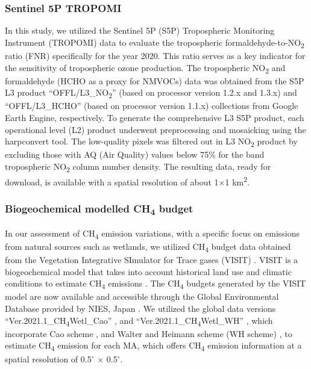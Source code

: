 \subsubsection{Sentinel 5P TROPOMI}
In this study, we utilized the Sentinel 5P (S5P) Tropospheric Monitoring Instrument (TROPOMI) data to evaluate the tropospheric formaldehyde-to-NO\textsubscript{2} ratio (FNR) specifically for the year 2020. This ratio serves as a key indicator for the sensitivity of tropospheric ozone production. The tropospheric NO\textsubscript{2} and formaldehyde (HCHO \textminus as a proxy for NMVOCs) data was obtained from the S5P L3 product \enquote{OFFL\slash L3\_NO\textsubscript{2}} (based on processor version 1.2.x and 1.3.x) and \enquote{OFFL\slash L3\_HCHO} (based on processor version 1.1.x) collections from Google Earth Engine, respectively. To generate the comprehensive L3 S5P product, each operational level (L2) product underwent preprocessing and mosaicking using the harpconvert tool. The low-quality pixels was filtered out in L3 NO\textsubscript{2} product by excluding those with AQ (Air Quality) values below 75\% for the band tropospheric NO\textsubscript{2} column number density. The resulting data, ready for download, is available with a spatial resolution of about 1$\times$1 km\textsuperscript{2}.
\subsubsection{Biogeochemical modelled CH\textsubscript{4} budget}
In our assessment of CH\textsubscript{4} emission variations, with a specific focus on emissions from natural sources such as wetlands, we utilized CH\textsubscript{4} budget data obtained from the Vegetation Integrative SImulator for Trace gases (VISIT) \citep{ito2019methane}. VISIT is a biogeochemical model that takes into account historical land use and climatic conditions to estimate CH\textsubscript{4} emissions \citep{ito2019methane}. The CH\textsubscript{4} budgets generated by the VISIT model are now available and accessible through the Global Environmental Database provided by NIES, Japan \citep{ito2019methane}. We utilized the global data versions \enquote{Ver.2021.1\_CH\textsubscript{4}Wetl\_Cao} \citep{ito2021cao}, and \enquote{Ver.2021.1\_CH\textsubscript{4}Wetl\_WH} \citep{ito2021wh}, which incorporate Cao scheme \citep{cao1996global}, and Walter and Heimann scheme (WH scheme) \citep{walter2000process}, to estimate CH\textsubscript{4} emission for each MA, which offers CH\textsubscript{4} emission information at a spatial resolution of 0.5$^{\circ}$ $\times$ 0.5$^{\circ}$. \par
